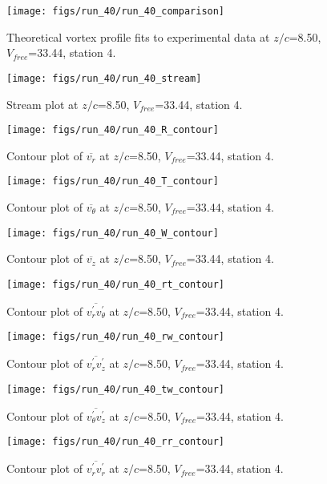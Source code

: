 \begin{figure}[H]
\centering
\texttt{[image: figs/run\_40/run\_40\_comparison]}
\caption{Theoretical vortex profile fits to experimental data at $z/c$=8.50, $V_{free}$=33.44, station 4.}
\end{figure}


\begin{figure}[H]
\centering
\texttt{[image: figs/run\_40/run\_40\_stream]}
\caption{Stream plot at $z/c$=8.50, $V_{free}$=33.44, station 4.}
\end{figure}


\begin{figure}[H]
\centering
\texttt{[image: figs/run\_40/run\_40\_R\_contour]}
\caption{Contour plot of $\overline{v_{r}}$ at $z/c$=8.50, $V_{free}$=33.44, station 4.}
\end{figure}


\begin{figure}[H]
\centering
\texttt{[image: figs/run\_40/run\_40\_T\_contour]}
\caption{Contour plot of $\overline{v_{\theta}}$ at $z/c$=8.50, $V_{free}$=33.44, station 4.}
\end{figure}


\begin{figure}[H]
\centering
\texttt{[image: figs/run\_40/run\_40\_W\_contour]}
\caption{Contour plot of $\overline{v_{z}}$ at $z/c$=8.50, $V_{free}$=33.44, station 4.}
\end{figure}


\begin{figure}[H]
\centering
\texttt{[image: figs/run\_40/run\_40\_rt\_contour]}
\caption{Contour plot of $\overline{v_{r}^{\prime} v_{\theta}^{\prime}}$ at $z/c$=8.50, $V_{free}$=33.44, station 4.}
\end{figure}


\begin{figure}[H]
\centering
\texttt{[image: figs/run\_40/run\_40\_rw\_contour]}
\caption{Contour plot of $\overline{v_{r}^{\prime} v_{z}^{\prime}}$ at $z/c$=8.50, $V_{free}$=33.44, station 4.}
\end{figure}


\begin{figure}[H]
\centering
\texttt{[image: figs/run\_40/run\_40\_tw\_contour]}
\caption{Contour plot of $\overline{v_{\theta}^{\prime} v_{z}^{\prime}}$ at $z/c$=8.50, $V_{free}$=33.44, station 4.}
\end{figure}


\begin{figure}[H]
\centering
\texttt{[image: figs/run\_40/run\_40\_rr\_contour]}
\caption{Contour plot of $\overline{v_{r}^{\prime} v_{r}^{\prime}}$ at $z/c$=8.50, $V_{free}$=33.44, station 4.}
\end{figure}


